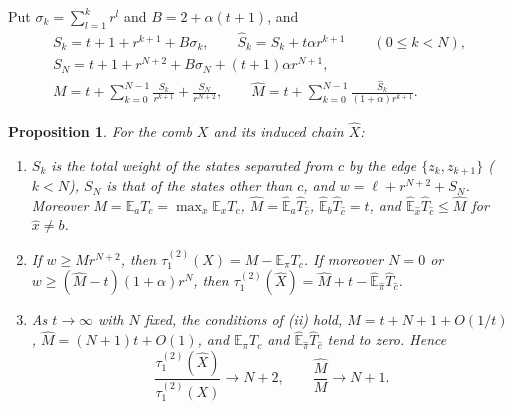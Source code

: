 \documentclass[11pt]{amsart}
\newtheorem{proposition}[theorem]{Proposition}
\theoremstyle{definition}
\newcommand{\E}{\mathbb{E}}
\newcommand{\tmix}{\tau_1^{(2)}}
\newcommand{\hE}{\widehat{\E}}
\newcommand{\hpi}{\widehat{\pi}}
\newcommand{\hX}{\widehat{X}}
\newcommand{\hM}{\widehat{M}}
\newcommand{\hS}{\widehat{S}}
\begin{document}
Put $\sigma_k=\sum_{l=1}^kr^l$ and $B=2+\alpha(t+1)$, and
\begin{gather*}
S_k=t+1+r^{k+1}+B\sigma_k,\qquad \hS_k=S_k+t\alpha r^{k+1}\qquad(0\le k<N),\\
S_N=t+1+r^{N+2}+B\sigma_N+(t+1)\alpha r^{N+1},\\
M=t+\sum_{k=0}^{N-1}\frac{S_k}{r^{k+1}}+\frac{S_N}{r^{N+2}},\qquad
\hM=t+\sum_{k=0}^{N-1}\frac{\hS_k}{(1+\alpha)r^{k+1}} .
\end{gather*}

\begin{proposition}\label{prop:comb}
For the comb $X$ and its induced chain $\hX$:
\begin{enumerate}
\item[(i)] $S_k$ is the total weight of the states separated from $c$ by the edge $\{z_k,z_{k+1}\}$ ($k<N$), $S_N$ is
that of the states other than $c$, and $w=\ell+r^{N+2}+S_N$. Moreover $M=\E_aT_c=\max_x\E_xT_c$,
$\hM=\hE_a\widehat T_{\hat c}$, $\hE_b\widehat T_{\hat c}=t$, and $\hE_{\hat x}\widehat T_{\hat c}\le\hM$ for
$\hat x\ne b$.
\item[(ii)] If $w\ge Mr^{N+2}$, then $\tmix(X)=M-\E_\pi T_c$. If moreover $N=0$ or $w\ge(\hM-t)(1+\alpha)r^N$, then
$\tmix(\hX)=\hM+t-\hE_{\hpi}\widehat T_{\hat c}$.
\item[(iii)] As $t\to\infty$ with $N$ fixed, the conditions of (ii) hold, $M=t+N+1+O(1/t)$,
$\hM=(N+1)t+O(1)$, and $\E_\pi T_c$ and $\hE_{\hpi}\widehat T_{\hat c}$ tend to zero. Hence
\[
\frac{\tmix(\hX)}{\tmix(X)}\to N+2,\qquad \frac{\hM}{M}\to N+1 .
\]
\end{enumerate}
\end{proposition}
\end{document}
